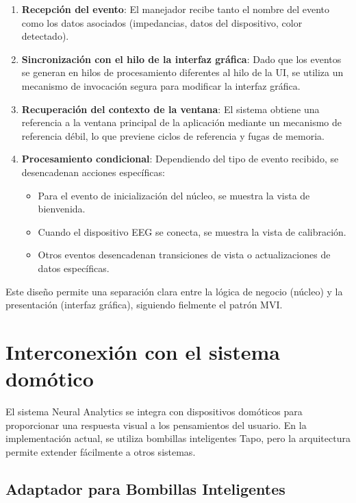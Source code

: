 \begin{enumerate}
    \item \textbf{Recepción del evento}: El manejador recibe tanto el nombre del evento como los datos asociados (impedancias, datos del dispositivo, color detectado).
    
    \item \textbf{Sincronización con el hilo de la interfaz gráfica}: Dado que los eventos se generan en hilos de procesamiento diferentes al hilo de la UI, se utiliza un mecanismo de invocación segura para modificar la interfaz gráfica.
    
    \item \textbf{Recuperación del contexto de la ventana}: El sistema obtiene una referencia a la ventana principal de la aplicación mediante un mecanismo de referencia débil, lo que previene ciclos de referencia y fugas de memoria.
    
    \item \textbf{Procesamiento condicional}: Dependiendo del tipo de evento recibido, se desencadenan acciones específicas:
    \begin{itemize}
        \item Para el evento de inicialización del núcleo, se muestra la vista de bienvenida.
        \item Cuando el dispositivo EEG se conecta, se muestra la vista de calibración.
        \item Otros eventos desencadenan transiciones de vista o actualizaciones de datos específicas.
    \end{itemize}
\end{enumerate}

Este diseño permite una separación clara entre la lógica de negocio (núcleo) y la presentación (interfaz gráfica), siguiendo fielmente el patrón MVI.

\section{Interconexión con el sistema domótico}

El sistema Neural Analytics se integra con dispositivos domóticos para proporcionar una respuesta visual a los pensamientos del usuario. En la implementación actual, se utiliza bombillas inteligentes Tapo, pero la arquitectura permite extender fácilmente a otros sistemas.

\subsection{Adaptador para Bombillas Inteligentes}


